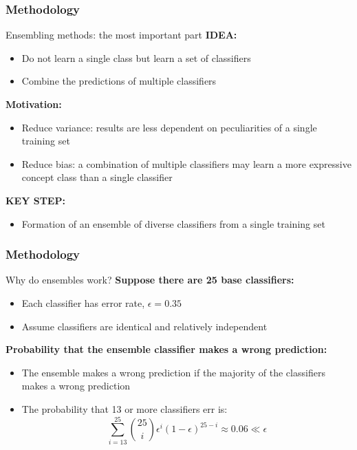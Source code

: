 \documentclass[xcolor={x11names,svgnames,dvipsnames}]{beamer}
\begin{document}
\begin{frame}
\frametitle{Methodology}

	\begin{block}{Ensembling methods: the most important part}
		\textbf{IDEA:} 
			 \begin{itemize}
			 \item Do not learn a single class but learn a set of classifiers
			 \item Combine the predictions of multiple classifiers	 
			 \end{itemize}
		\textbf{Motivation:} 
			 \begin{itemize}
			 \item Reduce variance: results are less dependent on peculiarities of
			 a single training set
			 
			 \item Reduce bias: a combination of multiple classifiers may learn a
			 more expressive concept class than a single classifier
			 	 
			 \end{itemize}
		\textbf{ KEY STEP:} 
			 \begin{itemize}
			 \item  Formation of an ensemble of diverse classifiers from a
			 single training set			 
			 \end{itemize}


	\end{block}
\end{frame}



\begin{frame}
\frametitle{Methodology}

	\begin{block}{Why do ensembles work?}
		\textbf{Suppose there are 25 base classifiers:} 
			 \begin{itemize}
			 \item Each classifier has error rate, $\epsilon= 0.35$
			 
			 \item  Assume classifiers are identical and relatively independent
			 			 	 
			 \end{itemize}
		\textbf{Probability that the ensemble classifier makes a wrong
		prediction:} 
			 \begin{itemize}
			 \item The ensemble makes a wrong prediction if the majority of
			 the classifiers makes a wrong prediction
			 
			 
			 \item The probability that 13 or more classifiers err is:
			 \begin{equation*}
				 \sum_{i=13}^{25} {25 \choose i}\epsilon^i(1-\epsilon)^{25-i}\approx 0.06\ll \epsilon
			 \end{equation*}
			 \end{itemize}

	\end{block}
\end{frame}
\end{document}
